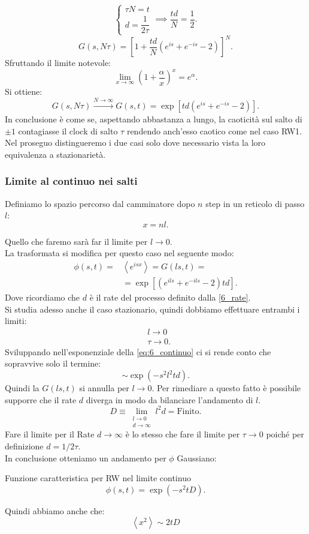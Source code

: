 \[
    \begin{cases}
        \tau N = t\\
	d = \dfrac{1}{2\tau}
    \end{cases}
    \implies  
    \frac{td}{N} = \frac{1}{2}
.\] 
\[
    G(s,N\tau) = \left[1 + \frac{td}{N}\left(e^{is}+ e^{-is}-2\right)\right]^N
.\] 
Sfruttando il limite notevole:
\[
    \lim_{x \to \infty} \left(1+\frac{\alpha}{x}\right)^{x} = e^{\alpha}
.\] 
Si ottiene:
\[
    G(s, N\tau) \xrightarrow[]{N \to \infty} G(s,t) = \exp\left[td\left(e^{is}+e^{-is}-2\right)\right]
.\] 
In conclusione è come se, aspettando abbastanza a lungo, la caoticità sul salto di $\pm 1$ contagiasse il clock di salto $\tau$ rendendo anch'esso caotico come nel caso RW1.\\
Nel proseguo distingueremo i due casi solo dove necessario vista la loro equivalenza a stazionarietà.

\subsubsection{Limite al continuo nei salti}%
\label{subsub:Limite al continuo}
Definiamo lo spazio percorso dal camminatore dopo $n$ step in un reticolo di passo $l$:
\[
    x = nl
.\] 

Quello che faremo sarà far il limite per $l\to 0$.\\
La trasformata si modifica per questo caso nel seguente modo:
\begin{equation}
\begin{aligned}
    \phi (s,t) = &\left<e^{isx}\right> = G(ls, t) =\\
		 & = \exp \left[\left(e^{ils} + e^{-ils} -2 \right)td\right]
		 \label{eq:6_continuo}
.\end{aligned}
\end{equation}
Dove ricordiamo che $d$ è il rate del processo definito dalla \ref{6_rate}.\\
Si studia adesso anche il caso stazionario, quindi dobbiamo effettuare entrambi i limiti:
\[\begin{aligned}
    &l\to 0\\
    &\tau\to 0
.\end{aligned}\]
Sviluppando nell'esponenziale della \ref{eq:6_continuo} ci si rende conto che sopravvive solo il termine:
\[
    \sim \exp\left(-s^2l^2td\right)
.\] 
Quindi la $G(ls, t)$ si annulla per $l \to 0$. Per rimediare a questo fatto è possibile supporre che il rate $d$ diverga in modo da bilanciare l'andamento di $l$.
\[
    D \equiv \lim \limits_{\substack{%
	         l \to 0\\
		  d \to \infty}} l^2d = \text{Finito}
.\] 
Fare il limite per il Rate $d\to \infty$ è lo stesso che fare il limite per $\tau\to 0$ poiché per definizione $d = 1 /2\tau$.\\
In conclusione otteniamo un andamento per $\phi$ Gaussiano:
\begin{bluebox}{Funzione caratteristica per RW nel limite continuo}
\[
    \phi (s,t) = \exp\left(-s^2tD\right)
.\]     
\end{bluebox}
\noindent
Quindi abbiamo anche che:
\begin{equation}
    \left<x^2\right> \sim  2tD \label{eq:6_mom_sec}
\end{equation}
